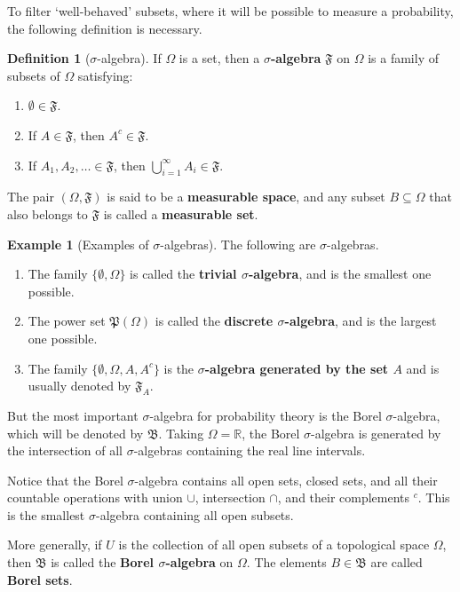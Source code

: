 \documentclass[12pt,a4paper]{article}
\theoremstyle{definition}
\newtheorem{example}{Example}[section]
\newtheorem{definition}{Definition}[section]
\begin{document}
To filter `well-behaved' subsets, where it will be possible to measure a probability, the following definition is necessary.

\begin{definition}[$\sigma$-algebra]
	If $\Omega$ is a set, then a \textbf{$\sigma$-algebra} $\mathfrak{F}$ on $\Omega$ is a family of subsets of $\Omega$ satisfying:
	\begin{enumerate}
		\item $\emptyset \in \mathfrak{F}$.
		\item If $A \in \mathfrak{F}$, then $A^c \in \mathfrak{F}$.
		\item If $A_1, A_2, \ldots \in \mathfrak{F}$, then $\bigcup_{i=1}^\infty A_i \in \mathfrak{F}$.
	\end{enumerate}
	The pair $(\Omega, \mathfrak{F})$ is said to be a \textbf{measurable space}, and any subset $B \subseteq \Omega$ that also belongs to $\mathfrak{F}$ is called a \textbf{measurable set}.
\end{definition}

\begin{example}[Examples of $\sigma$-algebras]
	The following are $\sigma$-algebras.
	\begin{enumerate}
		\item The family $\{\emptyset, \Omega\}$ is called the \textbf{trivial $\sigma$-algebra}, and is the smallest one possible.
		\item The power set $\mathfrak{P}(\Omega)$ is called the \textbf{discrete $\sigma$-algebra}, and is the largest one possible.
		\item The family $\{\emptyset, \Omega, A, A^c\}$ is the \textbf{$\sigma$-algebra generated by the set $A$} and is usually denoted by $\mathfrak{F}_A$.
	\end{enumerate}
\end{example}

But the most important $\sigma$-algebra for probability theory is the Borel $\sigma$-algebra, which will be denoted by $\mathfrak{B}$. Taking $\Omega = \mathbb{R}$, the Borel $\sigma$-algebra is generated by the intersection of all $\sigma$-algebras containing the real line intervals.

Notice that the Borel $\sigma$-algebra contains all open sets, closed sets, and all their countable operations with union $\cup$, intersection $\cap$, and their complements $^c$. This is the smallest $\sigma$-algebra containing all open subsets.

More generally, if $U$ is the collection of all open subsets of a topological space $\Omega$, then $\mathfrak{B}$ is called the \textbf{Borel $\sigma$-algebra} on $\Omega$. The elements $B \in \mathfrak{B}$ are called \textbf{Borel sets}.
\end{document}
